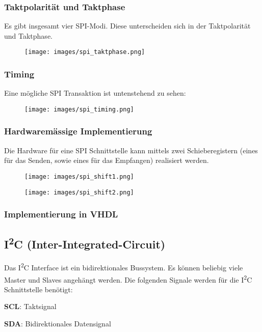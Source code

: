 \subsubsection{Taktpolarität und Taktphase}
Es gibt insgesamt vier SPI-Modi. Diese unterscheiden sich in der Taktpolarität und Taktphase.
\begin{figure}[H]
    \texttt{[image: images/spi\_taktphase.png]}
\end{figure}

\subsubsection{Timing}
Eine mögliche SPI Transaktion ist untenstehend zu sehen:
\begin{figure}[H]
    \texttt{[image: images/spi\_timing.png]}
\end{figure}

\subsubsection{Hardwaremässige Implementierung}
Die Hardware für eine SPI Schnittstelle kann mittels zwei Schieberegistern (eines für das Senden, sowie eines für das Empfangen) realisiert werden.
\begin{multicols}{2}
    \begin{figure}[H]
        \texttt{[image: images/spi\_shift1.png]}
    \end{figure}
    \begin{figure}[H]
        \texttt{[image: images/spi\_shift2.png]}
    \end{figure}
\end{multicols}

\subsubsection{Implementierung in VHDL}


\subsection{I\textsuperscript{2}C (Inter-Integrated-Circuit)}
Das I\textsuperscript{2}C Interface ist ein bidirektionales Bussystem. Es können beliebig viele Master und Slaves angehängt werden. Die folgenden Signale werden für die I\textsuperscript{2}C Schnittstelle benötigt:
\begin{compactitem}
    \item \textbf{SCL}: Taktsignal
    \item \textbf{SDA}: Bidirektionales Datensignal
\end{compactitem}

